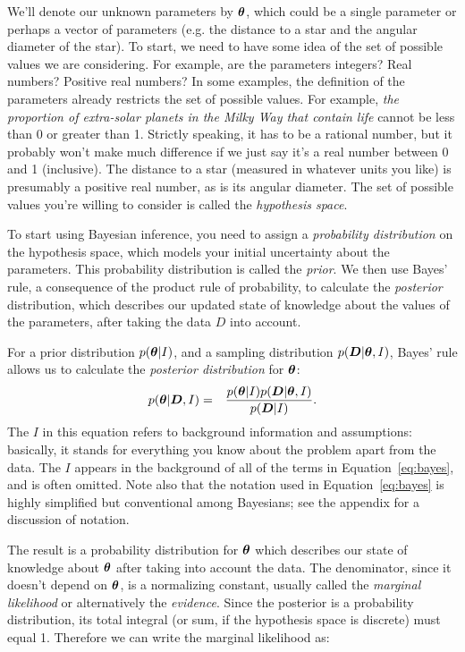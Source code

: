 We'll denote our unknown parameters by $\boldsymbol{\theta}$, which could be a single
parameter or perhaps a vector of parameters (e.g. the distance to a star
and the angular diameter of the star). To start, we
need to have some idea of the set of possible values we are considering. For
example, are the parameters integers? Real numbers? Positive real numbers?
In some examples, the definition of the parameters already restricts the set
of possible values. For example, {\it the proportion of extra-solar planets in
the Milky Way that contain life} cannot be less than 0 or greater than 1.
Strictly speaking, it has to be a rational number, but it probably won't make
much difference if we just say it's a real number between 0 and 1 (inclusive).
The distance to a star (measured in whatever units you like) is presumably a
positive real number, as is its angular diameter.
The set of possible values you're willing to consider is called the
{\it hypothesis space}.

To start using Bayesian inference, you need to assign a {\it probability
distribution} on the hypothesis space, which models your initial uncertainty
about the parameters. This probability distribution is called the {\it prior}.
We then use Bayes' rule, a consequence of the product rule of probability,
to calculate the {\it posterior} distribution, which describes our updated
state of knowledge about the values of the parameters, after taking the data
$D$ into account.

For a prior distribution $p(\boldsymbol{\theta} | I)$, and a sampling
distribution $p(\boldsymbol{D} | \boldsymbol{\theta}, I)$, Bayes' rule allows us to calculate
the {\it posterior distribution} for $\boldsymbol{\theta}$:
\begin{eqnarray}
p(\boldsymbol{\theta} | \boldsymbol{D}, I) &=& \frac{p(\boldsymbol{\theta} | I)p(\boldsymbol{D} | \boldsymbol{\theta}, I)}{p(\boldsymbol{D} | I)}.\label{eq:bayes}
\end{eqnarray}
The $I$ in this equation refers to background information and assumptions:
basically, it stands for everything you know about the problem apart from the
data. The $I$ appears in the background of all of the terms in
Equation~\ref{eq:bayes}, and is often omitted. Note also that the notation
used in Equation~\ref{eq:bayes} is highly simplified but conventional among
Bayesians; see the appendix for a discussion of notation.

The result is a probability distribution for $\boldsymbol{\theta}$ which describes
our state of knowledge about $\boldsymbol{\theta}$ after taking into account the data.
The denominator, since it doesn't depend on $\boldsymbol{\theta}$, is a normalizing
constant, usually called the {\it marginal likelihood} or alternatively the
{\it evidence}. Since the posterior is a probability distribution, its
total integral (or sum, if the
hypothesis space is discrete) must equal 1. Therefore we can write the
marginal likelihood as:

